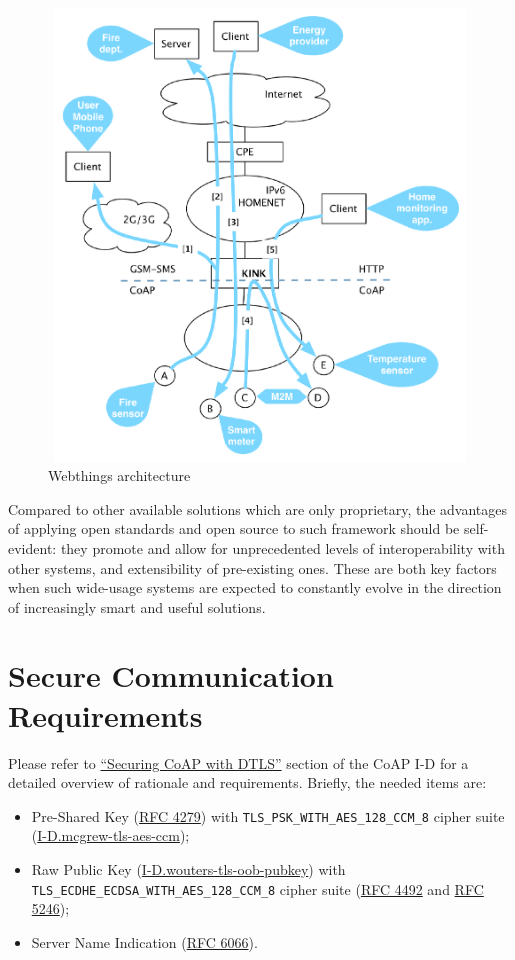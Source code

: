 \documentclass[10pt]{article}
\begin{document}
\begin{figure}
  \centering
  \includegraphics[width=12cm,height=12cm]{../share/images/kink-homenet}
    \caption{Webthings architecture}
    \label{fig:arch}
\end{figure}

Compared to other available solutions which are only proprietary, the advantages of applying open standards and open source to such framework should be self-evident: they promote and allow for unprecedented levels of interoperability with other systems, and extensibility of pre-existing ones. These are both key factors when such wide-usage systems are expected to constantly evolve in the direction of increasingly smart and useful solutions.

\section{Secure Communication Requirements}

Please refer to \href{http://tools.ietf.org/html/draft-ietf-core-coap-08#section-10.1}{``Securing CoAP with DTLS''} section of the CoAP I-D for a detailed overview of rationale and requirements.  Briefly, the needed items are:

\begin{itemize}
\item Pre-Shared Key (\href{http://tools.ietf.org/html/rfc4279}{RFC 4279}) with \texttt{TLS\_PSK\_WITH\_AES\_128\_CCM\_8} cipher suite (\href{http://tools.ietf.org/html/draft-mcgrew-tls-aes-ccm-ecc-02}{I-D.mcgrew-tls-aes-ccm});
\item Raw Public Key (\href{http://tools.ietf.org/html/draft-wouters-tls-oob-pubkey}{I-D.wouters-tls-oob-pubkey}) with \texttt{TLS\_ECDHE\_ECDSA\_WITH\_AES\_128\_CCM\_8} cipher suite (\href{http://tools.ietf.org/html/rfc4492}{RFC 4492} and \href{http://tools.ietf.org/html/rfc5246}{RFC 5246});
\item Server Name Indication (\href{http://tools.ietf.org/html/rfc6066}{RFC 6066}).
\end{itemize}
\end{document}

